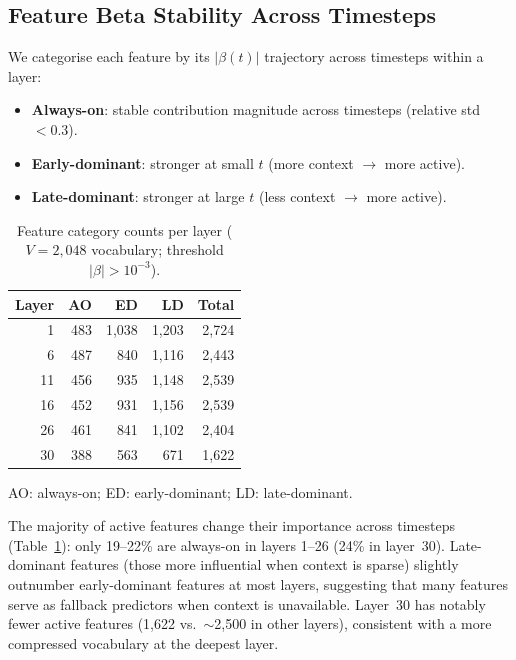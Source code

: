 \documentclass{article}
\begin{document}
\subsection{Feature Beta Stability Across Timesteps}

We categorise each feature by its $|\beta(t)|$ trajectory across timesteps within a layer:
\begin{itemize}
    \item \textbf{Always-on}: stable contribution magnitude across timesteps (relative std $< 0.3$).
    \item \textbf{Early-dominant}: stronger at small $t$ (more context $\to$ more active).
    \item \textbf{Late-dominant}: stronger at large $t$ (less context $\to$ more active).
\end{itemize}

\begin{table}[t]
\centering
\caption{Feature category counts per layer ($V = 2{,}048$ vocabulary; threshold $|\beta| > 10^{-3}$).}
\label{tab:beta_stability}
\vskip 0.1in
\begin{small}
\begin{sc}
\begin{tabular}{r rrrr}
\toprule
\textbf{Layer} & \textbf{AO} & \textbf{ED} & \textbf{LD} & \textbf{Total} \\
\midrule
1  & 483 & 1,038 & 1,203 & 2,724 \\
6  & 487 &   840 & 1,116 & 2,443 \\
11 & 456 &   935 & 1,148 & 2,539 \\
16 & 452 &   931 & 1,156 & 2,539 \\
26 & 461 &   841 & 1,102 & 2,404 \\
30 & 388 &   563 &   671 & 1,622 \\
\bottomrule
\end{tabular}
\end{sc}
\end{small}
\vskip -0.05in
{\small AO: always-on; ED: early-dominant; LD: late-dominant.}
\end{table}

The majority of active features change their importance across timesteps (Table~\ref{tab:beta_stability}): only 19--22\% are always-on in layers 1--26 (24\% in layer~30).
Late-dominant features (those more influential when context is sparse) slightly outnumber early-dominant features at most layers, suggesting that many features serve as fallback predictors when context is unavailable.
Layer~30 has notably fewer active features (1,622 vs.\ $\sim$2,500 in other layers), consistent with a more compressed vocabulary at the deepest layer.
\end{document}
